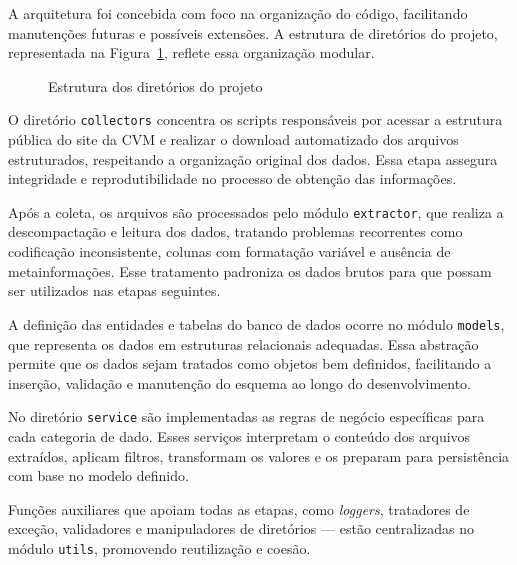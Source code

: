 A arquitetura foi concebida com foco na organização do código, facilitando manutenções futuras e possíveis extensões. A estrutura de diretórios do projeto, representada na Figura~\ref{fig:estrutura_pasta_src}, reflete essa organização modular.

\begin{figure}[!htb]
	\centering
	\caption{Estrutura dos diretórios do projeto}
	\label{fig:estrutura_pasta_src}
	\begin{varwidth}{\linewidth}
	\end{varwidth}
\end{figure}

O diretório \texttt{collectors} concentra os scripts responsáveis por acessar a estrutura pública do site da CVM e realizar o download automatizado dos arquivos estruturados, respeitando a organização original dos dados. Essa etapa assegura integridade e reprodutibilidade no processo de obtenção das informações.

Após a coleta, os arquivos são processados pelo módulo \texttt{extractor}, que realiza a descompactação e leitura dos dados, tratando problemas recorrentes como codificação inconsistente, colunas com formatação variável e ausência de metainformações. Esse tratamento padroniza os dados brutos para que possam ser utilizados nas etapas seguintes.

A definição das entidades e tabelas do banco de dados ocorre no módulo \texttt{models}, que representa os dados em estruturas relacionais adequadas. Essa abstração permite que os dados sejam tratados como objetos bem definidos, facilitando a inserção, validação e manutenção do esquema ao longo do desenvolvimento.

No diretório \texttt{service} são implementadas as regras de negócio específicas para cada categoria de dado. Esses serviços interpretam o conteúdo dos arquivos extraídos, aplicam filtros, transformam os valores e os preparam para persistência com base no modelo definido.

Funções auxiliares que apoiam todas as etapas, como \textit{loggers}, tratadores de exceção, validadores e manipuladores de diretórios — estão centralizadas no módulo \texttt{utils}, promovendo reutilização e coesão.

